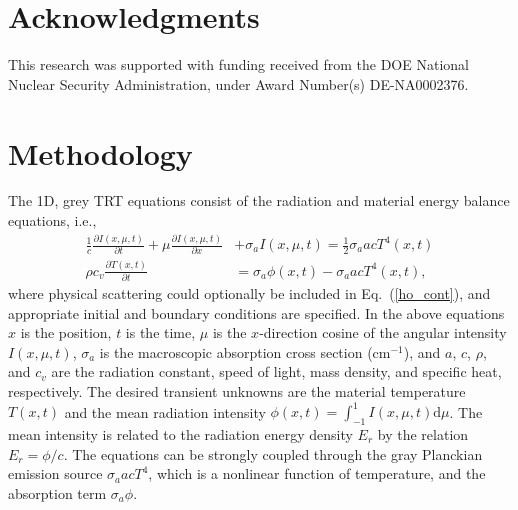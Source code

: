 \documentclass{anstrans}
\renewcommand{\eqref}[1]{(\ref{#1})}
\newcommand{\pderiv}[2]{\frac{\partial #1}{\partial #2}}
\renewcommand{\d}{\mathrm{d}}
\begin{document}
\section{Acknowledgments}

This research was supported with funding received from the DOE National
Nuclear Security Administration, under Award Number(s) DE-NA0002376. 

\section{Methodology}
The 1D, grey TRT equations consist of the radiation and
material energy balance equations, i.e.,\vspace{-0.05in}
\begin{align}\label{ho_cont}
    \frac{1}{c}\pderiv{I(x,\mu,t)}{t} + \mu \pderiv{I(x,\mu,t)}{x} &+ \sigma_a
    I(x,\mu,t)
= \frac{1}{2} \sigma_a a c T^4(x,t)
    \\ \label{t_cont}
  \rho c_v \pderiv{T(x,t)}{t} &=  \sigma_a \phi(x,t) - \sigma_a a c T^4(x,t),
\end{align}
where physical scattering could optionally be included in Eq.~\eqref{ho_cont}, and
appropriate initial and boundary conditions are specified.
In the above equations $x$ is the position, $t$ is the time, $\mu$ is
the $x$-direction cosine of the angular intensity $I(x,\mu,t)$, $\sigma_a$ is the
macroscopic absorption cross section (cm$^{-1}$), and $a$, $c$, $\rho$,
and
$c_v$ are the radiation constant, speed of light, mass density, and specific heat,
respectively.  The desired transient unknowns are the material
temperature $T(x,t)$ and the mean radiation intensity $\phi(x,t)=\int_{-1}^1
I(x,\mu,t) \d \mu$.  The mean intensity is related to the radiation energy density
$E_r$ by the relation $E_r = \phi/c$.  The equations can be 
strongly coupled through the gray Planckian emission source $\sigma_a a c T^4$, which
is a nonlinear function of temperature, and the absorption
term $\sigma_a \phi$.  
\end{document}
